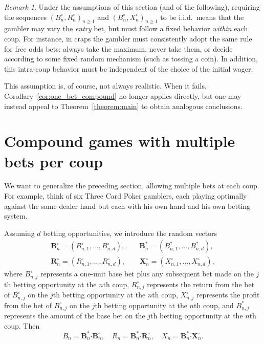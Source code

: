 \documentclass{article}
\theoremstyle{definition}
\theoremstyle{remark}
\newtheorem{remark}[theorem]{Remark}
\begin{document}
\begin{remark}
Under the assumptions of this section (and of the following), requiring the sequences $(B_n^\circ,R_n^\circ)_{n\ge1}$ and $(B_n^\circ,X_n^\circ)_{n\ge1}$ to be i.i.d.\ means that the gambler may vary the \textit{entry} bet, but must follow a fixed behavior \textit{within} each coup.  
For instance, in craps the gambler must consistently adopt the same rule for free odds bets: always take the maximum, never take them, or decide according to some fixed random mechanism (such as tossing a coin).  
In addition, this intra-coup behavior must be independent of the choice of the initial wager.

This assumption is, of course, not always realistic.  
When it fails, Corollary~\ref{cor:one_bet_compound} no longer applies directly, but one may instead appeal to Theorem~\ref{theorem:main} to obtain analogous conclusions.
\end{remark}







\section{Compound games with multiple bets per coup}\label{sec:compound-multiple}

We want to generalize the preceding section, allowing multiple bets at each coup.  For example, think of six Three Card Poker gamblers, each playing optimally against the same dealer hand but each with his own hand and his own betting system.

Assuming $d$ betting opportunities, we introduce the random vectors
\begin{align*}
\bm B_n^\circ=(B_{n,1}^\circ,\ldots,B_{n,d}^\circ),\qquad \bm B_n^*=(B_{n,1}^*,\ldots,B_{n,d}^*),\\
\bm R_n^\circ=(R_{n,1}^\circ,\ldots,R_{n,d}^\circ),\qquad \bm X_n^\circ=(X_{n,1}^\circ,\ldots,X_{n,d}^\circ),
\end{align*}
where $B_{n,j}^\circ$ represents a one-unit base bet plus any subsequent bet made on the $j$th betting opportunity at the $n$th coup, $R_{n,j}^\circ$ represents the return from the bet of $B_{n,j}^\circ$ on the $j$th betting opportunity at the $n$th coup, $X_{n,j}^\circ$ represents the profit from the bet of $B_{n,j}^\circ$ on the $j$th betting opportunity at the $n$th coup, and $B_{n,j}^*$ represents the amount of the base bet on the $j$th betting opportunity at the $n$th coup.  Then
\begin{equation*}
B_n=\bm B_n^*\bm\cdot\bm B_n^\circ,\quad R_n=\bm B_n^*\bm\cdot\bm R_n^\circ,\quad X_n=\bm B_n^*\bm\cdot\bm X_n^\circ.
\end{equation*}
\end{document}
